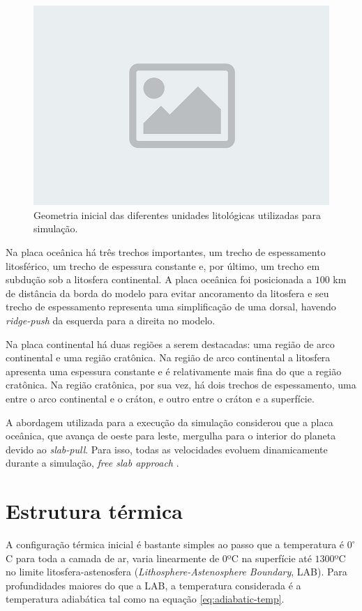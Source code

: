\begin{figure}
    \centering
    \includegraphics[width=0.6 \textwidth]{fig/placeholder.jpeg}
    \caption{Geometria inicial das diferentes unidades litológicas utilizadas para simulação.}
    \label{fig:geometria-inicial}
\end{figure}

Na placa oceânica há três trechos importantes, um trecho de espessamento litosférico, um trecho de espessura constante e, por último, um trecho em subdução sob a litosfera continental. A placa oceânica foi posicionada a $100$ km de distância da borda do modelo para evitar ancoramento da litosfera e seu trecho de espessamento representa uma simplificação de uma dorsal, havendo \textit{ridge-push} da esquerda para a direita no modelo.

Na placa continental há duas regiões a serem destacadas: uma região de arco continental e uma região cratônica. Na região de arco continental a litosfera apresenta uma espessura constante e é relativamente mais fina do que a região cratônica. Na região cratônica, por sua vez, há dois trechos de espessamento, uma entre o arco continental e o cráton, e outro entre o cráton e a superfície.

A abordagem utilizada para a execução da simulação considerou que a placa oceânica, que avança de oeste para leste, mergulha para o interior do planeta devido ao \textit{slab-pull}. Para isso, todas as velocidades evoluem dinamicamente durante a simulação, \textit{free slab approach} \citep{assuncao2019}.

\section{Estrutura térmica}

A configuração térmica inicial é bastante simples ao passo que a temperatura é $0^{\circ}$C para toda a camada de ar, varia linearmente de $0$ºC na superfície até $1300$ºC no limite litosfera-astenosfera (\textit{Lithosphere-Astenosphere Boundary}, LAB). Para profundidades maiores do que a LAB, a temperatura considerada é a temperatura adiabática tal como na equação \ref{eq:adiabatic-temp}.

